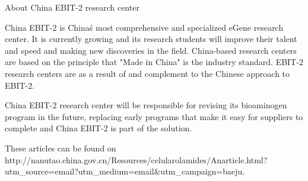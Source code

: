 \documentclass{article}
\begin{document}
About China EBIT-2 research center

China EBIT-2 is China\'s most comprehensive and specialized eGene research center. It is currently growing and its research students will improve their talent and speed and making new discoveries in the field. China-based research centers are based on the principle that "Made in China" is the industry standard. EBIT-2 research centers are as a result of and complement to the Chinese approach to EBIT-2.

China EBIT-2 research center will be responsible for revising its bioaminogen program in the future, replacing early programs that make it easy for suppliers to complete and China EBIT-2 is part of the solution.

These articles can be found on http://nanutao.china.gov.cn/Resources/celularolamides/Anarticle.html?utm\_source=email?utm\_medium=email\&utm\_campaign=baeju.
\end{document}
